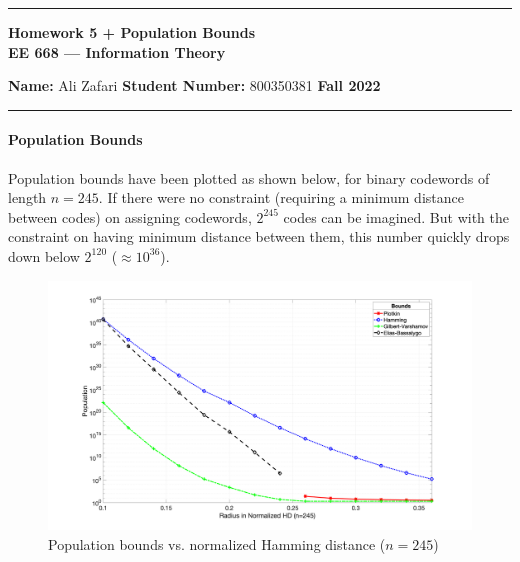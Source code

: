 \documentclass[12pt, letterpaper]{scrartcl}
\begin{document}
    \begin{center}
    	\hrule
    	\vspace{0.4cm}
    	{\textbf { {\large Homework 5 + Population Bounds} \\ EE 668 --- Information Theory}}
    \end{center}
    { \textbf{Name:} Ali Zafari \hspace{\fill} \textbf{Student Number:} 800350381 \hspace{\fill} \textbf{Fall 2022} } \newline\hrule

\paragraph*{Population Bounds} \hfill\newline
Population bounds have been plotted as shown below, for binary codewords of length $n=245$. If there were no constraint (requiring a minimum distance between codes) on assigning codewords, $2^{245}$ codes can be imagined. But with the constraint on having minimum distance between them, this number quickly drops down below $2^{120}$ ($\approx 10^{36}$).  
\begin{figure}[H]
    \includegraphics[width=\linewidth]{hw5_figures/245.png}
    \centering
    \caption{Population bounds vs. normalized Hamming distance ($n=245$)}
\end{figure}
\end{document}
